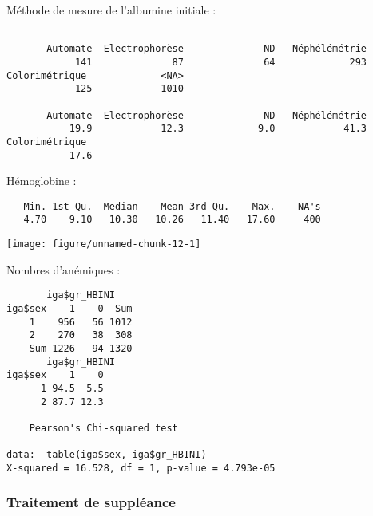 \documentclass[11pt,a4paper]{article}\usepackage[]{graphicx}\usepackage[]{color}
\makeatletter
\def\maxwidth{ %
  \ifdim\Gin@nat@width>\linewidth
    \linewidth
  \else
    \Gin@nat@width
  \fi
}
\newenvironment{kframe}{%
 \def\at@end@of@kframe{}%
 \ifinner\ifhmode%
  \def\at@end@of@kframe{\end{minipage}}%
  \begin{minipage}{\columnwidth}%
 \fi\fi%
 \def\FrameCommand##1{\hskip\@totalleftmargin \hskip-\fboxsep
 \colorbox{shadecolor}{##1}\hskip-\fboxsep
     \hskip-\linewidth \hskip-\@totalleftmargin \hskip\columnwidth}%
 \MakeFramed {\advance\hsize-\width
   \@totalleftmargin\z@ \linewidth\hsize
   \@setminipage}}%
 {\par\unskip\endMakeFramed%
 \at@end@of@kframe}
\newenvironment{knitrout}{}{} %
\makeatother
\begin{document}
Méthode de mesure de l'albumine initiale :

\begin{knitrout}
\color{fgcolor}\begin{kframe}
\begin{verbatim}

       Automate  Electrophorèse              ND   Néphélémétrie 
            141              87              64             293 
Colorimétrique             <NA> 
            125            1010 

       Automate  Electrophorèse              ND   Néphélémétrie 
           19.9            12.3             9.0            41.3 
Colorimétrique  
           17.6 
\end{verbatim}
\end{kframe}
\end{knitrout}

Hémoglobine :

\begin{knitrout}
\color{fgcolor}\begin{kframe}
\begin{verbatim}
   Min. 1st Qu.  Median    Mean 3rd Qu.    Max.    NA's 
   4.70    9.10   10.30   10.26   11.40   17.60     400 
\end{verbatim}
\end{kframe}
\texttt{[image: figure/unnamed-chunk-12-1]} 

\end{knitrout}

Nombres d'anémiques :

\begin{knitrout}
\color{fgcolor}\begin{kframe}
\begin{verbatim}
       iga$gr_HBINI
iga$sex    1    0  Sum
    1    956   56 1012
    2    270   38  308
    Sum 1226   94 1320
       iga$gr_HBINI
iga$sex    1    0
      1 94.5  5.5
      2 87.7 12.3

	Pearson's Chi-squared test

data:  table(iga$sex, iga$gr_HBINI)
X-squared = 16.528, df = 1, p-value = 4.793e-05
\end{verbatim}
\end{kframe}
\end{knitrout}


    \subsubsection{Traitement de suppléance}
\end{document}
